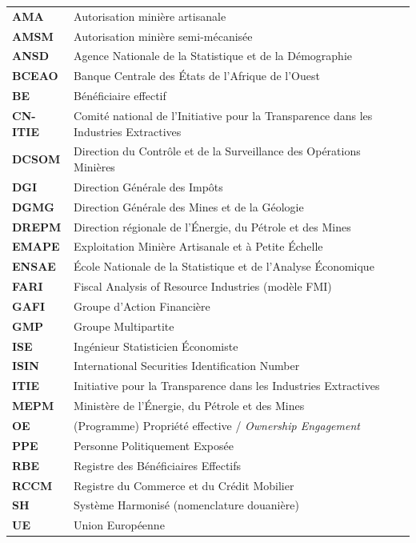 \documentclass[12pt, a4paper]{article}
\begin{document}
\begin{tabular}{p{3cm}p{11.5cm}}
  \textbf{AMA} & Autorisation minière artisanale\\
  \textbf{AMSM} & Autorisation minière semi-mécanisée\\
  \textbf{ANSD} & Agence Nationale de la Statistique et de la Démographie\\
  \textbf{BCEAO} & Banque Centrale des États de l'Afrique de l'Ouest\\
  \textbf{BE} & Bénéficiaire effectif\\
  \textbf{CN-ITIE} & Comité national de l'Initiative pour la Transparence dans les Industries Extractives\\
  \textbf{DCSOM} & Direction du Contrôle et de la Surveillance des Opérations Minières\\
  \textbf{DGI} & Direction Générale des Impôts\\
  \textbf{DGMG} & Direction Générale des Mines et de la Géologie\\
  \textbf{DREPM} & Direction régionale de l'Énergie, du Pétrole et des Mines\\
  \textbf{EMAPE} & Exploitation Minière Artisanale et à Petite Échelle\\
  \textbf{ENSAE} & École Nationale de la Statistique et de l'Analyse Économique\\
  \textbf{FARI} & Fiscal Analysis of Resource Industries (modèle FMI)\\
  \textbf{GAFI} & Groupe d'Action Financière\\
  \textbf{GMP} & Groupe Multipartite\\
  \textbf{ISE} & Ingénieur Statisticien Économiste\\
  \textbf{ISIN} & International Securities Identification Number\\
  \textbf{ITIE} & Initiative pour la Transparence dans les Industries Extractives\\
  \textbf{MEPM} & Ministère de l'Énergie, du Pétrole et des Mines\\
  \textbf{OE} & (Programme) Propriété effective / \emph{Ownership Engagement}\\
  \textbf{PPE} & Personne Politiquement Exposée\\
  \textbf{RBE} & Registre des Bénéficiaires Effectifs\\
  \textbf{RCCM} & Registre du Commerce et du Crédit Mobilier\\
  \textbf{SH} & Système Harmonisé (nomenclature douanière)\\
  \textbf{UE} & Union Européenne\\
\end{tabular}
\end{document}
